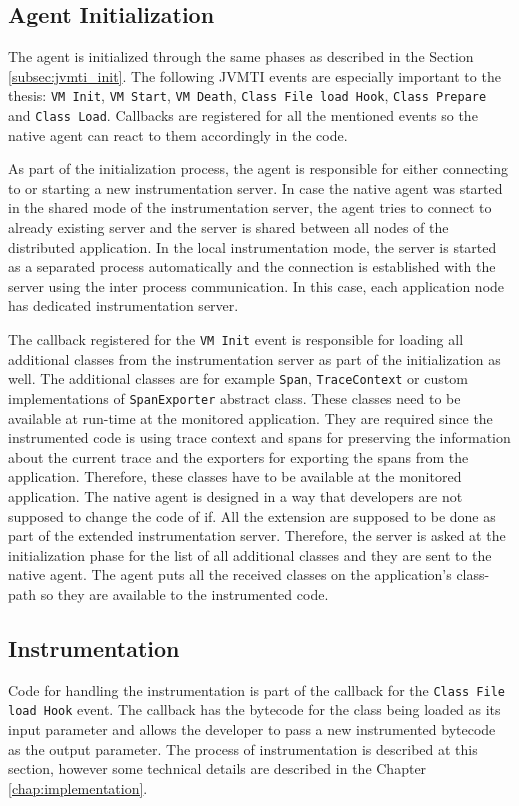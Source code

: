 \subsection{Agent Initialization}
The agent is initialized through the same phases as described in the Section \ref{subsec:jvmti_init}. The following JVMTI events are especially important to the thesis: \texttt{VM Init}, \texttt{VM Start}, \texttt{VM Death}, \texttt{Class File load Hook}, \texttt{Class Prepare} and \texttt{Class Load}. Callbacks are registered for all the mentioned events so the native agent can react to them accordingly in the code.

As part of the initialization process, the agent is responsible for either connecting to or starting a new instrumentation server. In case the native agent was started in the shared mode of the instrumentation server, the agent tries to connect to already existing server and the server is shared between all  nodes of the distributed application. In the local instrumentation mode, the server is started as a separated process automatically and the connection is established with the server using the inter process communication. In this case, each application node has dedicated instrumentation server.

The callback registered for the \texttt{VM Init} event is responsible for loading all additional classes from the instrumentation server as part of the initialization as well. The additional classes are for example \texttt{Span}, \texttt{TraceContext} or custom implementations of \texttt{SpanExporter} abstract class. These classes need to be available at run-time at the monitored application. They are required since the instrumented code is using trace context and spans for preserving the information about the current trace and the exporters for exporting the spans from the application. Therefore, these classes have to be available at the monitored application. The native agent is designed in a way that developers are not supposed to change the code of if. All the extension are supposed to be done as part of the extended instrumentation server. Therefore, the server is asked at the initialization phase for the list of all additional classes and they are sent to the native agent. The agent puts all the received classes on the application's class-path so they are available to the instrumented code.

\subsection{Instrumentation}
Code for handling the instrumentation is part of the callback for the \texttt{Class File load Hook} event. The callback has the bytecode for the class being loaded as its input parameter and allows the developer to pass a new instrumented bytecode as the output parameter. The process of instrumentation is described at this section, however some technical details are described in the Chapter \ref{chap:implementation}.

